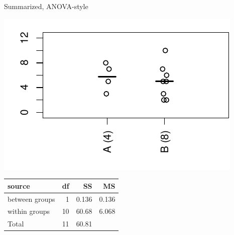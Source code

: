 \begin{frame}{Summarized, ANOVA-style}

  \begin{center}
    \includegraphics{dots3ex.pdf}

    \vspace{2em}

    \begin{tabular}{lrrr}
      source & df & SS & MS \\
      \hline
      between groups & 1 & 0.136 & 0.136 \\
      within groups & 10 & 60.68 & 6.068 \\
      \hline
      Total & 11 & 60.81 & \\
    \end{tabular}

  \end{center}

\end{frame}

